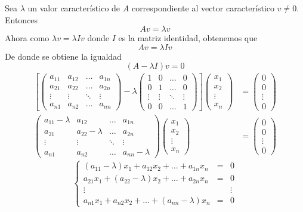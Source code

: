 \documentclass[10pt,a4paper]{report}
\theoremstyle{definition}
\theoremstyle{remark}
\numberwithin{section}{chapter}
\numberwithin{equation}{chapter}
\numberwithin{tacounter}{chapter}
\begin{document}
\noindent Sea $\lambda$ un valor característico de $A$ correspondiente al vector característico $v \neq 0$. Entonces 
$$Av = \lambda v$$
Ahora como $\lambda v = \lambda I v$ donde $I$ es la matriz identidad, obtenemos que 
$$Av = \lambda I v$$
De donde se obtiene la igualdad 
$$(A - \lambda I) v = 0$$
\begin{align*}
\left[ \left( \begin{array}{cccc}
a_{11} & a_{12} & \ldots & a_{1n}\\
a_{21} & a_{22} & \ldots & a_{2n}\\
\vdots & \vdots & \ddots & \vdots\\
a_{n1} & a_{n2} & \ldots & a_{nn}
\end{array} \right) - \lambda \left( \begin{array}{cccc}
1 & 0 & \ldots & 0\\
0 & 1 & \ldots & 0\\
\vdots & \vdots & \ddots & \vdots\\
0 & 0 & \ldots & 1
\end{array} \right) \right] \left( \begin{array}{c}
x_1\\
x_2\\
\vdots\\
x_n
\end{array} \right) &= \left( \begin{array}{c}
0\\
0\\
\vdots\\
0
\end{array} \right)\\
\left( \begin{array}{cccc}
a_{11} - \lambda & a_{12} & \ldots & a_{1n}\\
a_{21} & a_{22} - \lambda & \ldots & a_{2n}\\
\vdots & \vdots & \ddots & \vdots\\
a_{n1} & a_{n2} & \ldots & a_{nn} - \lambda
\end{array} \right) \left( \begin{array}{c}
x_1\\
x_2\\
\vdots\\
x_n
\end{array} \right) &= \left( \begin{array}{c}
0\\
0\\
\vdots\\
0
\end{array} \right)
\end{align*}
$$\left\{ \begin{array}{ccl}
(a_{11}- \lambda)x_1 + a_{12} x_2 + \ldots + a_{1n} x_n & = & 0\\
a_{21}x_1 + (a_{22} - \lambda)x_2 + \ldots + a_{2n} x_n & = & 0\\
\vdots && \vdots\\
a_{n1} x_1 + a_{n2} x_2 + \ldots + (a_{nn} - \lambda) x_n & = & 0
\end{array}\right.$$
\end{document}
